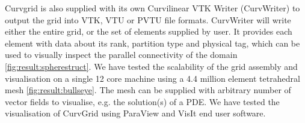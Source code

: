 \noindent
Curvgrid is also supplied with its own Curvilinear VTK Writer (CurvWriter) to output the grid into VTK, VTU or PVTU file formats. CurvWriter will write either the entire grid, or the set of elements supplied by user. It provides each element with data about its rank, partition type and physical tag, which can be used to visually inspect the parallel connectivity of the domain \cref{fig:result:spherestruct}. We have tested the scalability of the grid assembly and visualisation on a single 12 core machine using a 4.4 million element tetrahedral mesh \cref{fig:result:bullseye}. The mesh can be supplied with arbitrary number of vector fields to visualise, e.g. the solution(s) of a PDE. We have tested the visualisation of CurvGrid using ParaView \cite{johnson+2005} and VisIt \cite{childs+2012} end user software. \\

